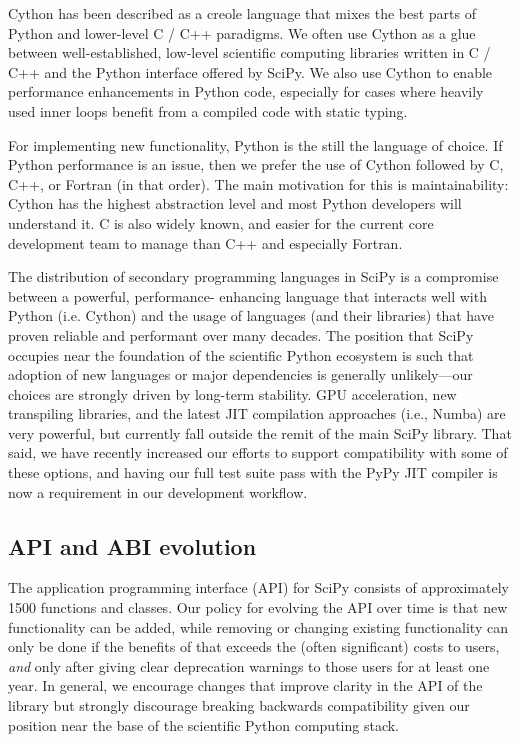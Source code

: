 \documentclass[fleqn,10pt]{wlscirep}
\begin{document}
Cython has been described as a creole language that mixes the best parts of Python and
lower-level C / C++ paradigms\cite{behnel2011cython}. We often use Cython
as a glue between well-established, low-level scientific computing libraries written
in C / C++ and the Python interface offered by SciPy. We also use Cython to enable performance
enhancements in Python code, especially for cases where heavily used inner
loops benefit from a compiled code with static typing. 

For implementing new functionality, Python is the still the language of choice. If Python 
performance is an issue, then we prefer the use of Cython followed by C, C++, or Fortran (in that
order). The main motivation for this is maintainability: Cython has the 
highest abstraction level and most Python developers will understand it. C is 
also widely known, and easier for the current core development team to manage
than C++ and especially Fortran. 

The distribution of secondary programming languages in SciPy is a compromise between
a powerful, performance-
enhancing language that interacts well with Python (i.e. Cython) and the
usage of languages (and their libraries) that have proven reliable and
performant over many decades. The position that SciPy occupies near the
foundation of the scientific Python ecosystem is such that adoption of new
languages or major dependencies is generally unlikely---our choices are strongly
driven by long-term stability. GPU acceleration, new transpiling libraries, and
the latest JIT compilation approaches (i.e.,
Numba\cite{Lam:2015:NLP:2833157.2833162}) are very powerful, but currently fall
outside the remit of the main SciPy library. That said, we have recently
increased our efforts to support compatibility with some of these options, and
having our full test suite pass with the PyPy JIT
compiler\cite{Bolz:2009:TMP:1565824.1565827} is now a requirement in our
development workflow.

\subsection*{API and ABI evolution}

The application programming interface (API) for SciPy consists of approximately
1500 functions and classes.  Our policy for evolving the API over time is that
new functionality can be added, while removing or changing existing
functionality can only be done if the benefits of that exceeds the (often
significant) costs to users, \textit{and} only after giving clear deprecation
warnings to those users for at least one year. In general, we encourage
changes that improve clarity in the API of the library but strongly discourage
breaking backwards compatibility given our position near the base of the 
scientific Python computing stack.
\end{document}
